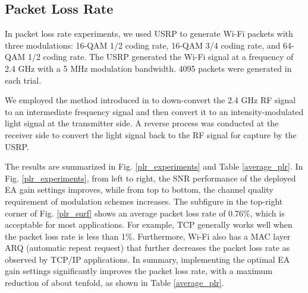 \subsection{Packet Loss Rate}
In packet loss rate experiments, we used USRP \cite{ettus2015universal} to generate Wi-Fi packets with three modulations: 16-QAM 1/2 coding rate, 16-QAM 3/4 coding rate, and 64-QAM 1/2 coding rate. The USRP generated the Wi-Fi signal at a frequency of 2.4 GHz with a 5 MHz modulation bandwidth. 4095 packets were generated in each trial. 
\par
We employed the method introduced in \cite{cui2024wi} to down-convert the 2.4 GHz RF signal to an intermediate frequency signal and then convert it to an intensity-modulated light signal at the transmitter side. A reverse process was conducted at the receiver side to convert the light signal back to the RF signal for capture by the USRP.
\par
The results are summarized in Fig. \ref{plr_experiments} and Table \ref{average_plr}. In Fig. \ref{plr_experiments}, from left to right, the SNR performance of the deployed EA gain settings improves, while from top to bottom, the channel quality requirement of modulation schemes increases. The subfigure in the top-right corner of Fig. \ref{plr_surf} shows an average packet loss rate of 0.76\%, which is acceptable for most applications. For example, TCP generally works well when the packet loss rate is less than 1\%. Furthermore, Wi-Fi also has a MAC layer ARQ (automatic repeat request) that further decreases the packet loss rate as observed by TCP/IP applications.  In summary, implementing the optimal EA gain settings significantly improves the packet loss rate, with a maximum reduction of about tenfold, as shown in Table \ref{average_plr}.
\begin{figure*}[htbp]
\centering
{}
\caption{Packet loss rate measurement results.}
\label{plr_experiments}
\vspace{-0.3cm}
\end{figure*}


